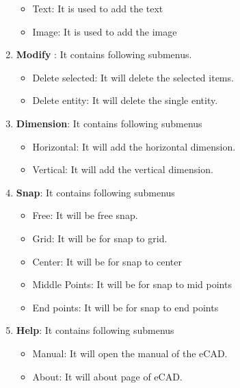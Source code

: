 \begin{enumerate}
\begin{itemize}
\item Text: It is used to add the text
\item Image: It is used to add the image
\end{itemize}
\item \textbf{Modify} : It contains following submenus.
\begin{itemize}
\item Delete selected: It will delete the selected items.
\item Delete entity: It will delete the single entity. 
\end{itemize}
\item \textbf{Dimension}: It contains following submenus
\begin{itemize}
\item Horizontal: It will add the horizontal dimension.
\item Vertical: It will add the vertical dimension. 
\end{itemize}
\item \textbf{Snap}: It contains following submenus
\begin{itemize}
\item Free: It will be free snap.
\item Grid: It will be for snap to grid. 
\item Center: It will be for snap to center
\item Middle Points: It will be for snap to mid points
\item End points: It will be for snap to end points
\end{itemize}
\item \textbf{Help}: It contains following submenus
\begin{itemize}
\item Manual: It will open the manual of the eCAD.
\item About: It will about page of eCAD. 
\end{itemize}
\end{enumerate}
\newpage
